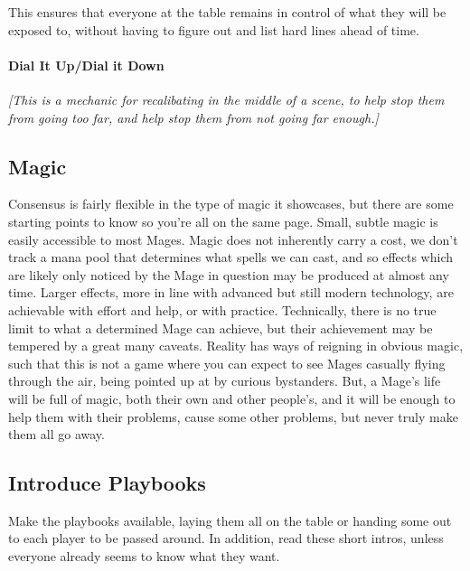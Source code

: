 \documentclass[
  oneside,
  statementpaper,
  9pt]{memoir}
\begin{document}
This ensures that everyone at the table remains in control of what they
will be exposed to, without having to figure out and list hard lines
ahead of time.

\hypertarget{dial-it-updial-it-down}{%
\paragraph{Dial It Up/Dial it Down}\label{dial-it-updial-it-down}}

\emph{{[}This is a mechanic for recalibating in the middle of a scene,
to help stop them from going too far, and help stop them from not going
far enough.{]}}

\hypertarget{magic}{%
\subsection{Magic}\label{magic}}

Consensus is fairly flexible in the type of magic it showcases, but
there are some starting points to know so you're all on the same page.
Small, subtle magic is easily accessible to most Mages. Magic does not
inherently carry a cost, we don't track a mana pool that determines what
spells we can cast, and so effects which are likely only noticed by the
Mage in question may be produced at almost any time. Larger effects,
more in line with advanced but still modern technology, are achievable
with effort and help, or with practice. Technically, there is no true
limit to what a determined Mage can achieve, but their achievement may
be tempered by a great many caveats. Reality has ways of reigning in
obvious magic, such that this is not a game where you can expect to see
Mages casually flying through the air, being pointed up at by curious
bystanders. But, a Mage's life will be full of magic, both their own and
other people's, and it will be enough to help them with their problems,
cause some other problems, but never truly make them all go away.

\hypertarget{introduce-playbooks}{%
\subsection{Introduce Playbooks}\label{introduce-playbooks}}

Make the playbooks available, laying them all on the table or handing
some out to each player to be passed around. In addition, read these
short intros, unless everyone already seems to know what they want.
\end{document}
